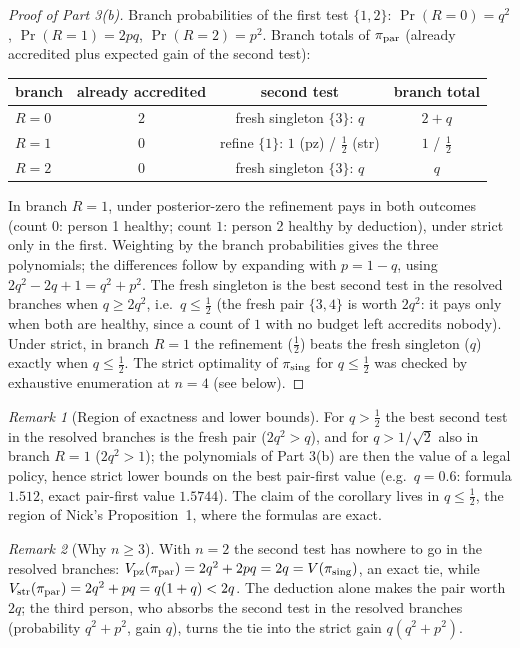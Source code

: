\documentclass[11pt]{article}
\theoremstyle{remark}
\newtheorem{remark}{Remark}
\newcommand{\pz}{\mathrm{pz}}
\newcommand{\str}{\mathrm{str}}
\begin{document}
\begin{proof}[Proof of Part 3(b)]
Branch probabilities of the first test $\{1,2\}$: $\Pr(R=0)=q^2$, $\Pr(R=1)=2pq$, $\Pr(R=2)=p^2$. Branch totals of $\pi_{\rm par}$ (already accredited plus expected gain of the second test):
\begin{center}
\begin{tabular}{lccc}
\toprule
branch & already accredited & second test & branch total \\
\midrule
$R=0$ & $2$ & fresh singleton $\{3\}$: $q$ & $2+q$ \\
$R=1$ & $0$ & refine $\{1\}$: $1$ (pz) / $\tfrac12$ (str) & $1$ / $\tfrac12$ \\
$R=2$ & $0$ & fresh singleton $\{3\}$: $q$ & $q$ \\
\bottomrule
\end{tabular}
\end{center}
In branch $R=1$, under posterior-zero the refinement pays in both outcomes (count $0$: person 1 healthy; count $1$: person 2 healthy by deduction), under strict only in the first. Weighting by the branch probabilities gives the three polynomials; the differences follow by expanding with $p=1-q$, using $2q^2-2q+1=q^2+p^2$. The fresh singleton is the best second test in the resolved branches when $q\ge 2q^2$, i.e.\ $q\le\tfrac12$ (the fresh pair $\{3,4\}$ is worth $2q^2$: it pays only when both are healthy, since a count of $1$ with no budget left accredits nobody). Under strict, in branch $R=1$ the refinement ($\tfrac12$) beats the fresh singleton ($q$) exactly when $q\le\tfrac12$. The strict optimality of $\pi_{\rm sing}$ for $q\le\tfrac12$ was checked by exhaustive enumeration at $n=4$ (see below).
\end{proof}

\begin{remark}[Region of exactness and lower bounds]\label{rem:region}
For $q>\tfrac12$ the best second test in the resolved branches is the fresh pair ($2q^2>q$), and for $q>1/\sqrt2$ also in branch $R=1$ ($2q^2>1$); the polynomials of Part 3(b) are then the value of a legal policy, hence strict lower bounds on the best pair-first value (e.g.\ $q=0.6$: formula $1.512$, exact pair-first value $1.5744$). The claim of the corollary lives in $q\le\tfrac12$, the region of Nick's Proposition~1, where the formulas are exact.
\end{remark}

\begin{remark}[Why $n\ge3$]
With $n=2$ the second test has nowhere to go in the resolved branches: $V_\pz(\pi_{\rm par})=2q^2+2pq=2q=V(\pi_{\rm sing})$, an exact tie, while $V_\str(\pi_{\rm par})=2q^2+pq=q(1+q)<2q$. The deduction alone makes the pair worth $2q$; the third person, who absorbs the second test in the resolved branches (probability $q^2+p^2$, gain $q$), turns the tie into the strict gain $q(q^2+p^2)$.
\end{remark}
\end{document}
